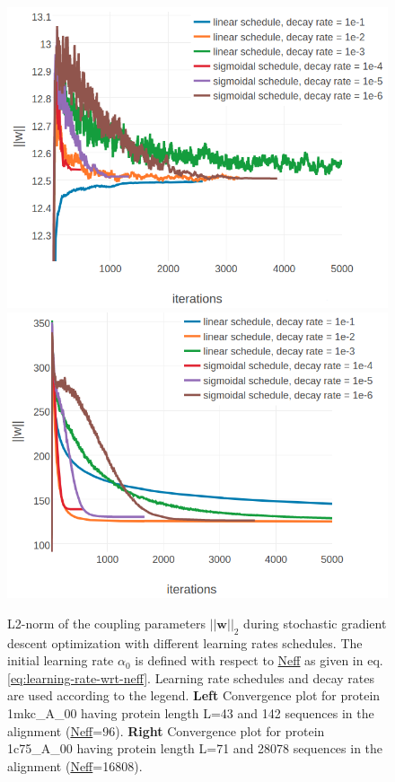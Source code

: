 \documentclass[12pt,a4paper,twoside]{book}
\newcommand{\w}{\mathbf{w}}
\theoremstyle{definition}
\theoremstyle{definition}
\theoremstyle{remark}
\begin{document}
\begin{figure}

{\centering \includegraphics[width=0.5\linewidth]{img/full_likelihood/sgd/parameter_norm_1mkca00_alpha0_different_schedules} \includegraphics[width=0.5\linewidth]{img/full_likelihood/sgd/parameter_norm_1c75a00_alpha0_different_schedules} 

}

\caption{L2-norm of the
coupling parameters \(||\w||_2\) during stochastic gradient descent
optimization with different learning rates schedules. The initial
learning rate \(\alpha_0\) is defined with respect to
\protect\hyperlink{abbrev}{Neff} as given in eq.
\eqref{eq:learning-rate-wrt-neff}. Learning rate schedules and decay rates
are used according to the legend. \textbf{Left} Convergence plot for
protein 1mkc\_A\_00 having protein length L=43 and 142 sequences in the
alignment (\protect\hyperlink{abbrev}{Neff}=96). \textbf{Right}
Convergence plot for protein 1c75\_A\_00 having protein length L=71 and
28078 sequences in the alignment
(\protect\hyperlink{abbrev}{Neff}=16808).}\label{fig:sgd-single-proteins-learning-rate-schedule}
\end{figure}
\end{document}
